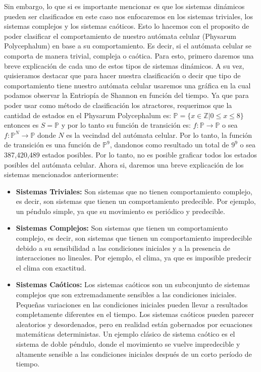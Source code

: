         Sin embargo, lo que si es importante mencionar es que los sistemas din\'amicos pueden ser clasificados
        en este caso nos enfocaremos en los sistemas triviales, los sistemas complejos y los sistemas ca\'oticos.
    \vskip 0.5cm
    Esto lo hacemos con el proposito de poder clasificar el comportamiento de nuestro aut\'omata celular (Physarum Polycephalum)
        en base a su comportamiento. Es decir, si el aut\'omata celular se comporta de manera trivial, compleja o ca\'otica.
        Para esto, primero daremos una breve explicaci\'on de cada uno de estos tipos de sistemas din\'amicos. A su vez, 
        quisieramos destacar que para hacer nuestra clasificaci\'on o decir que tipo de comportamiento tiene nuestro aut\'omata
        celular usaremos una gr\'afica en la cual podamos observar la Entriop\'ia de Shannon en funci\'on del tiempo. Ya que para
        poder usar como m\'etodo de clasificaci\'on los atractores, requerimos que la cantidad de estados en el Physarum Polycephalum
        es: $\mathbb{P} = \{x \in \mathbb{Z}| 0 \leq x \leq 8\}$ entonces es $S = \mathbb{P}$ y por lo tanto su funci\'on de transici\'on es: 
        $f: \mathbb{P} \rightarrow \mathbb{P}$ o sea $f: \mathbb{P}^{N} \rightarrow \mathbb{P}$ donde $N$ es la vecindad del aut\'omata celular.
        Por lo tanto, la funci\'on de transici\'on es una funci\'on de $\mathbb{P}^{9}$, 
        dandonos como resultado un total de $9^{9}$ o sea 387,420,489 estados posibles. Por lo tanto, no es posible graficar todos los
        estados posibles del aut\'omata celular.
    \vskip 0.5cm
    Ahora si, daremos una breve explicaci\'on de los sistemas mencionados anteriormente:
    \begin{itemize}
        \item \textbf{Sistemas Triviales:} Son sistemas que no tienen comportamiento complejo, es decir, son sistemas que
            tienen un comportamiento predecible. Por ejemplo, un p\'endulo simple, ya que su movimiento es peri\'odico y predecible.
        \item \textbf{Sistemas Complejos:} Son sistemas que tienen un comportamiento complejo, es decir, son sistemas que
            tienen un comportamiento impredecible debido a su sensibilidad a las condiciones iniciales y a la presencia de interacciones no 
            lineales.  Por ejemplo, el clima, ya que es imposible predecir el clima con exactitud.
        \item \textbf{Sistemas Ca\'oticos:} Los sistemas ca\'oticos son un subconjunto de sistemas complejos que son extremadamente sensibles 
            a las condiciones iniciales. Peque\~nas variaciones en las condiciones iniciales pueden llevar a resultados completamente diferentes en el
            tiempo. Los sistemas ca\'oticos pueden parecer aleatorios y desordenados, pero en realidad est\'an gobernados por ecuaciones matem\'aticas 
            deterministas. Un ejemplo cl\'asico de sistema ca\'otico es el sistema de doble p\'endulo, donde el movimiento se vuelve impredecible y 
            altamente sensible a las condiciones iniciales despu\'es de un corto per\'iodo de tiempo.
    \end{itemize}
